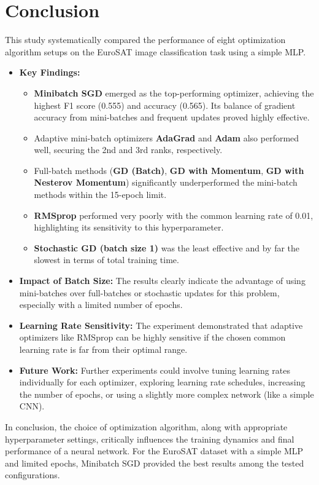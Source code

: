 \documentclass[11pt,a4paper]{article}
\begin{document}
\section{Conclusion}
This study systematically compared the performance of eight optimization algorithm setups on the EuroSAT image classification task using a simple MLP.

\begin{itemize}
    \item \textbf{Key Findings:}
    \begin{itemize}
        \item \textbf{Minibatch SGD} emerged as the top-performing optimizer, achieving the highest F1 score (0.555) and accuracy (0.565). Its balance of gradient accuracy from mini-batches and frequent updates proved highly effective.
        \item Adaptive mini-batch optimizers \textbf{AdaGrad} and \textbf{Adam} also performed well, securing the 2nd and 3rd ranks, respectively.
        \item Full-batch methods (\textbf{GD (Batch)}, \textbf{GD with Momentum}, \textbf{GD with Nesterov Momentum}) significantly underperformed the mini-batch methods within the 15-epoch limit.
        \item \textbf{RMSprop} performed very poorly with the common learning rate of 0.01, highlighting its sensitivity to this hyperparameter.
        \item \textbf{Stochastic GD (batch size 1)} was the least effective and by far the slowest in terms of total training time.
    \end{itemize}
    \item \textbf{Impact of Batch Size:} The results clearly indicate the advantage of using mini-batches over full-batches or stochastic updates for this problem, especially with a limited number of epochs.
    \item \textbf{Learning Rate Sensitivity:} The experiment demonstrated that adaptive optimizers like RMSprop can be highly sensitive if the chosen common learning rate is far from their optimal range.
    \item \textbf{Future Work:} Further experiments could involve tuning learning rates individually for each optimizer, exploring learning rate schedules, increasing the number of epochs, or using a slightly more complex network (like a simple CNN).
\end{itemize}
In conclusion, the choice of optimization algorithm, along with appropriate hyperparameter settings, critically influences the training dynamics and final performance of a neural network. For the EuroSAT dataset with a simple MLP and limited epochs, Minibatch SGD provided the best results among the tested configurations.
\end{document}
